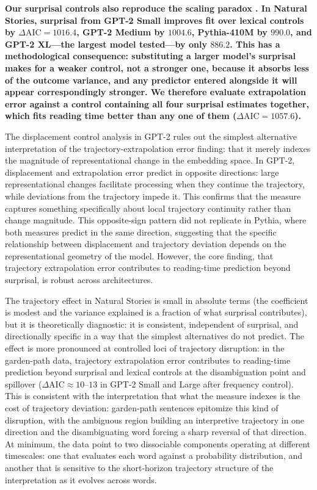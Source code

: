 \documentclass[12pt]{article}
\newcommand{\new}[1]{{\bfseries #1}}
\begin{document}
\new{Our surprisal controls also reproduce the scaling paradox \citep{oh2023b}. In Natural Stories, surprisal from GPT-2 Small improves fit over lexical controls by $\Delta\text{AIC} = 1016.4$, GPT-2 Medium by $1004.6$, Pythia-410M by $990.0$, and GPT-2 XL---the largest model tested---by only $886.2$. This has a methodological consequence: substituting a larger model's surprisal makes for a weaker control, not a stronger one, because it absorbs less of the outcome variance, and any predictor entered alongside it will appear correspondingly stronger. We therefore evaluate extrapolation error against a control containing all four surprisal estimates together, which fits reading time better than any one of them ($\Delta\text{AIC} = 1057.6$).}

The displacement control analysis in GPT-2 rules out the simplest alternative interpretation of the trajectory-extrapolation error finding: that it merely indexes the magnitude of representational change in the embedding space. In GPT-2, displacement and extrapolation error predict in opposite directions: large representational changes facilitate processing when they continue the trajectory, while deviations from the trajectory impede it. This confirms that the measure captures something specifically about local trajectory continuity rather than change magnitude. This opposite-sign pattern did not replicate in Pythia, where both measures predict in the same direction, suggesting that the specific relationship between displacement and trajectory deviation depends on the representational geometry of the model. However, the core finding, that trajectory extrapolation error contributes to reading-time prediction beyond surprisal, is robust across architectures.

The trajectory effect in Natural Stories is small in absolute terms (the coefficient is modest and the variance explained is a fraction of what surprisal contributes), but it is theoretically diagnostic: it is consistent, independent of surprisal, and directionally specific in a way that the simplest alternatives do not predict. The effect is more pronounced at controlled loci of trajectory disruption: in the garden-path data, trajectory extrapolation error contributes to reading-time prediction beyond surprisal and lexical controls at the disambiguation point and spillover ($\Delta\text{AIC} \approx 10\text{--}13$ in GPT-2 Small and Large after frequency control). This is consistent with the interpretation that what the measure indexes is the cost of trajectory deviation: garden-path sentences epitomize this kind of disruption, with the ambiguous region building an interpretive trajectory in one direction and the disambiguating word forcing a sharp reversal of that direction. At minimum, the data point to two dissociable components operating at different timescales: one that evaluates each word against a probability distribution, and another that is sensitive to the short-horizon trajectory structure of the interpretation as it evolves across words.
\end{document}
